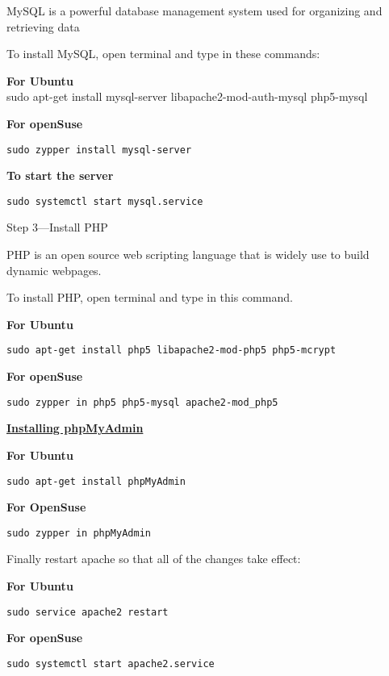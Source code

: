 \documentclass[16pt]{article}
\begin{document}
\begin{enumerate}
  MySQL is a powerful database management system used for organizing and
  retrieving data

  To install MySQL, open terminal and type in these commands:

  \textbf{For Ubuntu} \\ sudo apt-get install mysql-server
  libapache2-mod-auth-mysql php5-mysql

  \textbf{For openSuse}

  \texttt{sudo zypper install mysql-server}

  \textbf{To start the server}

  \texttt{sudo systemctl start mysql.service}
  
   \vspace{1cm}

  {\Large{\item{Step 3---Install PHP}}}
   \vspace{0.5cm}

  PHP is an open source web scripting language that is widely use to build
  dynamic webpages.

  To install PHP, open terminal and type in this command.

  \textbf{For Ubuntu}

  \texttt{sudo apt-get install php5 libapache2-mod-php5 php5-mcrypt}

  \textbf{For openSuse}

  \texttt{sudo zypper in php5 php5-mysql apache2-mod\_php5}
  
   \vspace{0.5cm}

  {\underline{\textbf{Installing phpMyAdmin}}}

  \textbf{For Ubuntu}

  \texttt{sudo apt-get install phpMyAdmin}

  \textbf{For OpenSuse}

  \texttt{sudo zypper in phpMyAdmin}
   \vspace{0.5cm}

  Finally restart apache so that all of the changes take effect:

  \textbf{For Ubuntu}

  \texttt{sudo service apache2 restart}

  \textbf{For openSuse}

  \texttt{sudo systemctl start apache2.service}
   \vspace{0.5cm}

  \end{enumerate}
\end{document}
